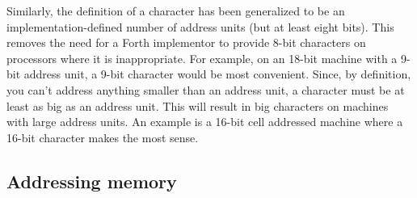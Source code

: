 Similarly, the definition of a character has been generalized to be
an implementation-defined number of address units (but at least eight
bits). This removes the need for a Forth implementor to provide 8-bit
characters on processors where it is inappropriate. For example, on
an 18-bit machine with a 9-bit address unit, a 9-bit character would
be most convenient. Since, by definition, you can't address anything
smaller than an address unit, a character must be at least as big as
an address unit. This will result in big characters on machines with
large address units. An example is a 16-bit cell addressed machine
where a 16-bit character makes the most sense.

\subsection{Addressing memory} %

